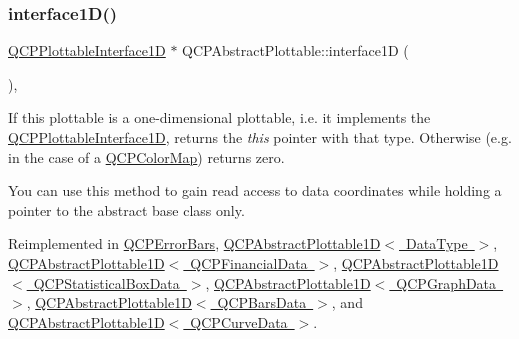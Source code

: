 \mbox{\label{class_q_c_p_abstract_plottable_a81fd9fd5c4f429c074785e2eb238a8e7}} 
\subsubsection{\texorpdfstring{interface1D()}{interface1D()}}
{\footnotesize\ttfamily \mbox{\hyperlink{class_q_c_p_plottable_interface1_d}{Q\+C\+P\+Plottable\+Interface1D}} $\ast$ Q\+C\+P\+Abstract\+Plottable\+::interface1D (\begin{DoxyParamCaption}{ }\end{DoxyParamCaption})\hspace{0.3cm}{\ttfamily [inline]}, {\ttfamily [virtual]}}

If this plottable is a one-\/dimensional plottable, i.\+e. it implements the \mbox{\hyperlink{class_q_c_p_plottable_interface1_d}{Q\+C\+P\+Plottable\+Interface1D}}, returns the {\itshape this} pointer with that type. Otherwise (e.\+g. in the case of a \mbox{\hyperlink{class_q_c_p_color_map}{Q\+C\+P\+Color\+Map}}) returns zero.

You can use this method to gain read access to data coordinates while holding a pointer to the abstract base class only. 

Reimplemented in \mbox{\hyperlink{class_q_c_p_error_bars_a0b6fbf3a943b4241ee485d066cc8562a}{Q\+C\+P\+Error\+Bars}}, \mbox{\hyperlink{class_q_c_p_abstract_plottable1_d_ac58fb47bfe330f6931ed8e64326387d7}{Q\+C\+P\+Abstract\+Plottable1\+D$<$ Data\+Type $>$}}, \mbox{\hyperlink{class_q_c_p_abstract_plottable1_d_ac58fb47bfe330f6931ed8e64326387d7}{Q\+C\+P\+Abstract\+Plottable1\+D$<$ Q\+C\+P\+Financial\+Data $>$}}, \mbox{\hyperlink{class_q_c_p_abstract_plottable1_d_ac58fb47bfe330f6931ed8e64326387d7}{Q\+C\+P\+Abstract\+Plottable1\+D$<$ Q\+C\+P\+Statistical\+Box\+Data $>$}}, \mbox{\hyperlink{class_q_c_p_abstract_plottable1_d_ac58fb47bfe330f6931ed8e64326387d7}{Q\+C\+P\+Abstract\+Plottable1\+D$<$ Q\+C\+P\+Graph\+Data $>$}}, \mbox{\hyperlink{class_q_c_p_abstract_plottable1_d_ac58fb47bfe330f6931ed8e64326387d7}{Q\+C\+P\+Abstract\+Plottable1\+D$<$ Q\+C\+P\+Bars\+Data $>$}}, and \mbox{\hyperlink{class_q_c_p_abstract_plottable1_d_ac58fb47bfe330f6931ed8e64326387d7}{Q\+C\+P\+Abstract\+Plottable1\+D$<$ Q\+C\+P\+Curve\+Data $>$}}.

\mbox{\label{class_q_c_p_abstract_plottable_a2cdd6f0dd5e9a979037f86b4000d9cfe}} 
